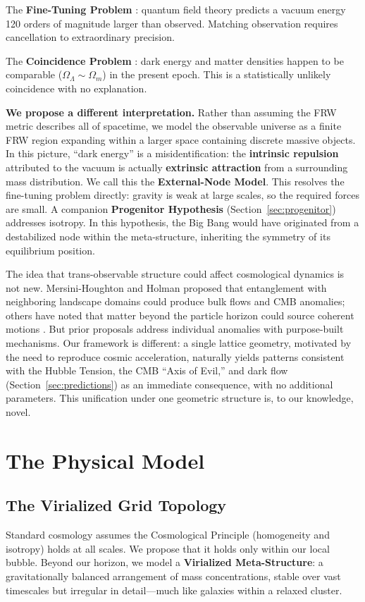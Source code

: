 \documentclass{article}
\begin{document}
The \textbf{Fine-Tuning Problem} \cite{Weinberg1989}: quantum field theory predicts a vacuum energy 120 orders of magnitude larger than observed.
Matching observation requires cancellation to extraordinary precision.

The \textbf{Coincidence Problem} \cite{Steinhardt1999}: dark energy and matter densities happen to be comparable ($\Omega_\Lambda \sim \Omega_m$) in the present epoch. This is a statistically unlikely coincidence with no explanation.

\textbf{We propose a different interpretation.} Rather than assuming the FRW metric describes all of spacetime, we model the observable universe as a finite FRW region expanding within a larger space containing discrete massive objects.
In this picture, ``dark energy'' is a misidentification: the \textbf{intrinsic repulsion} attributed to the vacuum is actually \textbf{extrinsic attraction} from a surrounding mass distribution.
We call this the \textbf{External-Node Model}.
This resolves the fine-tuning problem directly: gravity is weak at large scales, so the required forces are small.
A companion \textbf{Progenitor Hypothesis} (Section~\ref{sec:progenitor}) addresses isotropy. In this hypothesis, the Big Bang would have originated from a destabilized node within the meta-structure, inheriting the symmetry of its equilibrium position.

The idea that trans-observable structure could affect cosmological dynamics is not new.
Mersini-Houghton and Holman \cite{MersiniHoughton2009} proposed that entanglement with neighboring landscape domains could produce bulk flows and CMB anomalies; others have noted that matter beyond the particle horizon could source coherent motions \cite{Kashlinsky2008}.
But prior proposals address individual anomalies with purpose-built mechanisms.
Our framework is different: a single lattice geometry, motivated by the need to reproduce cosmic acceleration, naturally yields patterns consistent with the Hubble Tension, the CMB ``Axis of Evil,'' and dark flow (Section~\ref{sec:predictions}) as an immediate consequence, with no additional parameters. This unification under one geometric structure is, to our knowledge, novel.

\section{The Physical Model}
\label{sec:model}

\subsection{The Virialized Grid Topology}
\label{sec:grid}
Standard cosmology assumes the Cosmological Principle (homogeneity and isotropy) holds at all scales.
We propose that it holds only within our local bubble.
Beyond our horizon, we model a \textbf{Virialized Meta-Structure}: a gravitationally balanced arrangement of mass concentrations, stable over vast timescales but irregular in detail—much like galaxies within a relaxed cluster.
\end{document}
